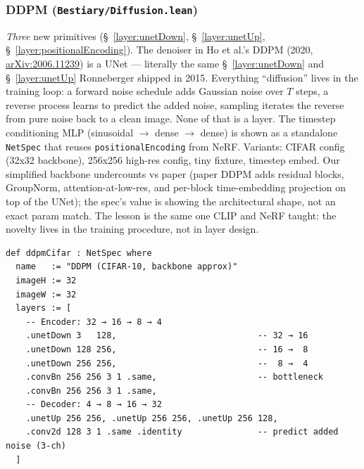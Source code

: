 \subsubsection*{DDPM (\texttt{Bestiary/Diffusion.lean})}
\emph{Three} new primitives (\S~\ref{layer:unetDown}, \S~\ref{layer:unetUp}, \S~\ref{layer:positionalEncoding}). The denoiser in Ho et al.'s DDPM (2020,
\href{https://arxiv.org/abs/2006.11239}{arXiv:2006.11239}) is a UNet
--- literally the same \S~\ref{layer:unetDown} and
\S~\ref{layer:unetUp} Ronneberger shipped in 2015. Everything ``diffusion'' lives in the training loop:
a forward noise schedule adds Gaussian noise over $T$ steps, a reverse
process learns to predict the added noise, sampling iterates the
reverse from pure noise back to a clean image. None of that is a
layer. The timestep conditioning MLP (sinusoidal $\to$ dense $\to$
dense) is shown as a standalone \texttt{NetSpec} that reuses
\texttt{positionalEncoding} from NeRF. Variants: CIFAR config (32x32
backbone), 256x256 high-res config, tiny fixture, timestep embed.
Our simplified backbone undercounts vs paper (paper DDPM adds
residual blocks, GroupNorm, attention-at-low-res, and per-block
time-embedding projection on top of the UNet); the spec's value is
showing the architectural shape, not an exact param match. The
lesson is the same one CLIP and NeRF taught: the novelty lives in
the training procedure, not in layer design.

\begin{verbatim}
def ddpmCifar : NetSpec where
  name   := "DDPM (CIFAR-10, backbone approx)"
  imageH := 32
  imageW := 32
  layers := [
    -- Encoder: 32 → 16 → 8 → 4
    .unetDown 3   128,                            -- 32 → 16
    .unetDown 128 256,                            -- 16 →  8
    .unetDown 256 256,                            --  8 →  4
    .convBn 256 256 3 1 .same,                    -- bottleneck
    .convBn 256 256 3 1 .same,
    -- Decoder: 4 → 8 → 16 → 32
    .unetUp 256 256, .unetUp 256 256, .unetUp 256 128,
    .conv2d 128 3 1 .same .identity               -- predict added noise (3-ch)
  ]
\end{verbatim}

